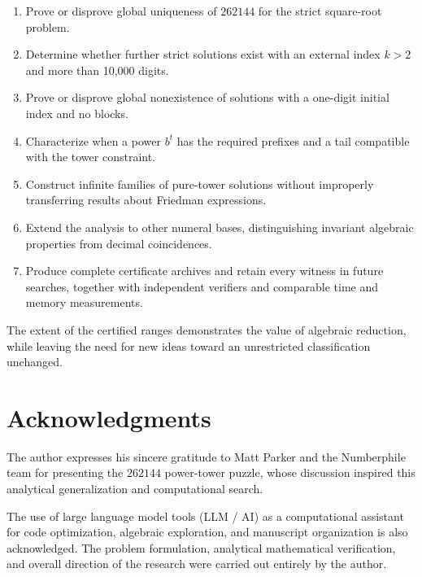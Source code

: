 \documentclass[11pt,a4paper]{article}
\begin{document}
\begin{enumerate}
\item Prove or disprove global uniqueness of $262144$ for the strict square-root problem.
\item Determine whether further strict solutions exist with an external index $k>2$ and more than 10,000 digits.
\item Prove or disprove global nonexistence of solutions with a one-digit initial index and no blocks.
\item Characterize when a power $b^t$ has the required prefixes and a tail compatible with the tower constraint.
\item Construct infinite families of pure-tower solutions without improperly transferring results about Friedman expressions.
\item Extend the analysis to other numeral bases, distinguishing invariant algebraic properties from decimal coincidences.
\item Produce complete certificate archives and retain every witness in future searches, together with independent verifiers and comparable time and memory measurements.
\end{enumerate}

The extent of the certified ranges demonstrates the value of algebraic reduction, while leaving the need for new ideas toward an unrestricted classification unchanged.

\section*{Acknowledgments}
The author expresses his sincere gratitude to Matt Parker and the Numberphile team for presenting the $262144$ power-tower puzzle, whose discussion inspired this analytical generalization and computational search.

The use of large language model tools (LLM / AI) as a computational assistant for code optimization, algebraic exploration, and manuscript organization is also acknowledged. The problem formulation, analytical mathematical verification, and overall direction of the research were carried out entirely by the author.
\end{document}
